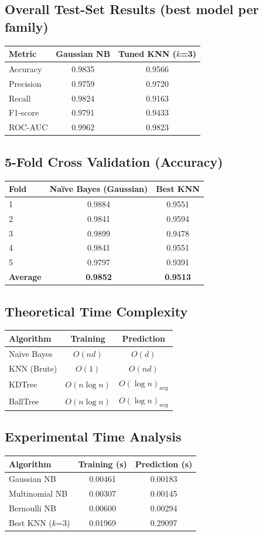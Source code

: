 \documentclass[12pt,a4paper]{article}
\begin{document}
\subsection*{Overall Test-Set Results (best model per family)}
\begin{tabular}{lcc}
\toprule
Metric & Gaussian NB & Tuned KNN ($k$=3)\\
\midrule
Accuracy & 0.9835 & 0.9566\\
Precision & 0.9759 & 0.9720 \\
Recall & 0.9824 & 0.9163 \\
F1-score & 0.9791 & 0.9433 \\
ROC-AUC & 0.9962 & 0.9823 \\
\bottomrule
\end{tabular}

\subsection*{5-Fold Cross Validation (Accuracy)}
\begin{tabular}{lcc}
\toprule
Fold & Na\"ive Bayes (Gaussian) & Best KNN\\
\midrule
1 & 0.9884 & 0.9551 \\
2 & 0.9841 & 0.9594 \\
3 & 0.9899 & 0.9478 \\
4 & 0.9841 & 0.9551 \\
5 & 0.9797 & 0.9391 \\
\midrule
\textbf{Average} & \textbf{0.9852} & \textbf{0.9513} \\
\bottomrule
\end{tabular}

\subsection*{Theoretical Time Complexity}
\begin{tabular}{lcc}
\toprule
Algorithm & Training & Prediction \\
\midrule
Na\"ive Bayes & $O(nd)$ & $O(d)$ \\
KNN (Brute) & $O(1)$ & $O(nd)$ \\
KDTree & $O(n\log n)$ & $O(\log n)_{avg}$ \\
BallTree & $O(n\log n)$ & $O(\log n)_{avg}$ \\
\bottomrule
\end{tabular}

\subsection*{Experimental Time Analysis}
\begin{tabular}{lcc}
\toprule
Algorithm & Training (s) & Prediction (s) \\
\midrule
Gaussian NB & 0.00461 & 0.00183 \\
Multinomial NB & 0.00307 & 0.00145 \\
Bernoulli NB & 0.00600 & 0.00294 \\
Best KNN ($k$=3) & 0.01969 & 0.29097 \\
\bottomrule
\end{tabular}
\end{document}
